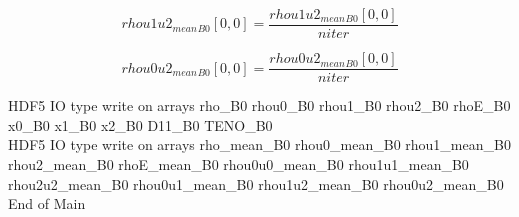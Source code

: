 \documentclass{article}
\begin{document}
\begin{dmath}{rhou1u2_{mean}{_{B0}}}[{0,0}] = \frac{{rhou1u2_{mean}{_{B0}}}[{0,0}]}{niter}\end{dmath}

\begin{dmath}{rhou0u2_{mean}{_{B0}}}[{0,0}] = \frac{{rhou0u2_{mean}{_{B0}}}[{0,0}]}{niter}\end{dmath}

\noindent HDF5 IO type write on arrays rho_B0 rhou0_B0 rhou1_B0 rhou2_B0 rhoE_B0 x0_B0 x1_B0 x2_B0 D11_B0 TENO_B0\\\noindent HDF5 IO type write on arrays rho_mean_B0 rhou0_mean_B0 rhou1_mean_B0 rhou2_mean_B0 rhoE_mean_B0 rhou0u0_mean_B0 rhou1u1_mean_B0 rhou2u2_mean_B0 rhou0u1_mean_B0 rhou1u2_mean_B0 rhou0u2_mean_B0\\\noindent End of Main\\
\end{document}
